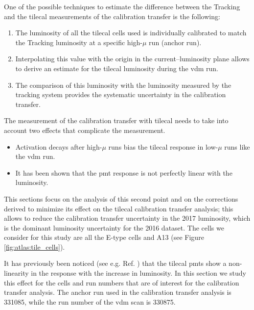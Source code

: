 One of the possible techniques to estimate 
the difference between the Tracking and the \gls{tilecal} measurements of the calibration transfer is the following:
\begin{enumerate}
\item The luminosity of all the \gls{tilecal} cells used is individually calibrated to match the Tracking luminosity 
at a specific high-$\mu$ run (anchor run).
\item Interpolating this value with the origin in the current--luminosity plane allows to derive an estimate for the \gls{tilecal} 
luminosity during the \gls{vdm} run.
\item The comparison of this luminosity with the luminosity measured by the tracking system provides the systematic uncertainty in the 
calibration transfer. 
\end{enumerate}
The measurement of the calibration transfer with \gls{tilecal} needs to take into account two effects that complicate the measurement. 
\begin{itemize}
\item Activation decays after high-$\mu$ runs bias the \gls{tilecal} response in low-$\mu$ runs like the \gls{vdm} run.
\item It has been shown that the \gls{pmt} response is not perfectly linear with the luminosity. 
\end{itemize}

This sections focus on the analysis of this second point and on the corrections derived to minimize its effect 
on the \gls{tilecal} calibration transfer analysis; this allows to reduce the calibration transfer uncertainty in the 
2017 luminosity, which is the dominant luminosity uncertainty for the 2016 dataset. 
The cells we consider for this study are all the E-type cells and A13 (see Figure \ref{fig:atlas:tile_cells}).

It has previously been noticed (see e.g. Ref. \cite{giulia:tesi}) that the \gls{tilecal} \glspl{pmt} show a non-linearity in 
the response with the increase in luminosity. 
In this section we study this effect for the cells and run numbers that are of interest for the 
calibration transfer analysis. 
The anchor run used in the calibration transfer analysis is 331085, while the run number of the \gls{vdm} 
scan is 330875.

